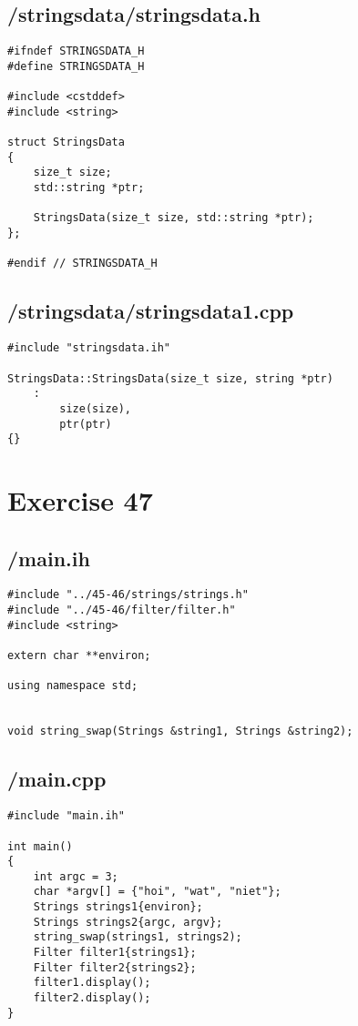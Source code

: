 \documentclass{article}
\begin{document}
\subsection*{/stringsdata/stringsdata.h}
\begin{verbatim}
#ifndef STRINGSDATA_H
#define STRINGSDATA_H

#include <cstddef>
#include <string>

struct StringsData 
{
    size_t size;
    std::string *ptr;

    StringsData(size_t size, std::string *ptr);
};

#endif // STRINGSDATA_H

\end{verbatim}
\subsection*{/stringsdata/stringsdata1.cpp}
\begin{verbatim}
#include "stringsdata.ih"

StringsData::StringsData(size_t size, string *ptr)
    :
        size(size),
        ptr(ptr)
{}

\end{verbatim}


\section*{Exercise 47}
\subsection*{/main.ih}
\begin{verbatim}
#include "../45-46/strings/strings.h"
#include "../45-46/filter/filter.h"
#include <string>

extern char **environ;

using namespace std;


void string_swap(Strings &string1, Strings &string2);

\end{verbatim}
\subsection*{/main.cpp}
\begin{verbatim}
#include "main.ih"

int main()
{
    int argc = 3;
    char *argv[] = {"hoi", "wat", "niet"};
    Strings strings1{environ};
    Strings strings2{argc, argv};
    string_swap(strings1, strings2);
    Filter filter1{strings1};
    Filter filter2{strings2};
    filter1.display();
    filter2.display();
}
\end{verbatim}
\end{document}
